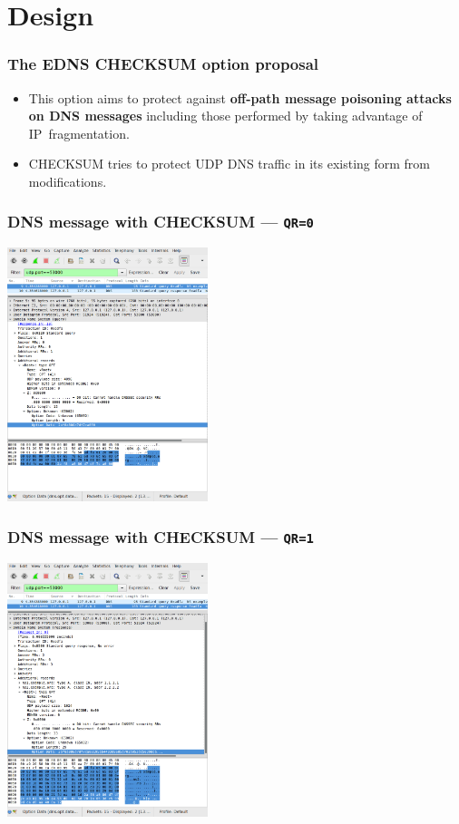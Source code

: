 \documentclass{beamer}
\begin{document}
\section{Design}

\frame
{
  \frametitle{The EDNS CHECKSUM option proposal}

  \begin{itemize}
  \item This option aims to protect against \textbf{off-path message
    poisoning attacks on DNS messages} including those performed by
    taking advantage of IP~fragmentation.
  \item CHECKSUM tries to protect UDP DNS traffic in its existing form
    from modifications.
  \end{itemize}
}

\frame
{
  \frametitle{DNS message with CHECKSUM --- \texttt{QR=0}}

  \includegraphics[height=20em]{qr0.png}
}

\frame
{
  \frametitle{DNS message with CHECKSUM --- \texttt{QR=1}}

  \includegraphics[height=20em]{qr1.png}
}
\end{document}

